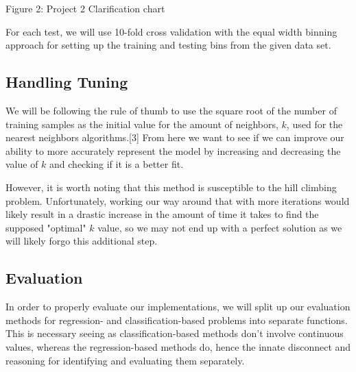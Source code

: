 \documentclass{article}
\begin{document}
\begin{center}
    \caption{Figure 2: Project 2 Clarification chart}
\end{center}

For each test, we will use 10-fold cross validation with the equal width binning approach for setting up the training and testing bins from the given data set.

\subsection*{Handling Tuning}

We will be following the rule of thumb to use the square root of the number of training samples as the initial value for the amount of neighbors, $k$, used for the nearest neighbors algorithms.[3] From here we want to see if we can improve our ability to more accurately represent the model by increasing and decreasing the value of $k$ and checking if it is a better fit.

However, it is worth noting that this method is susceptible to the hill climbing problem. Unfortunately, working our way around that with more iterations would likely result in a drastic increase in the amount of time it takes to find the supposed "optimal" $k$ value, so we may not end up with a perfect solution as we will likely forgo this additional step.

\subsection*{Evaluation}

In order to properly evaluate our implementations, we will split up our evaluation methods for regression- and classification-based problems into separate functions. This is necessary seeing as classification-based methods don't involve continuous values, whereas the regression-based methods do, hence the innate disconnect and reasoning for identifying and evaluating them separately.
\end{document}
